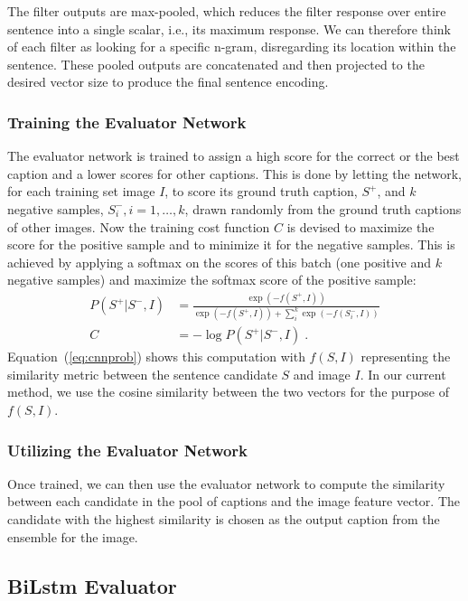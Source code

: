 The filter outputs are max-pooled, which reduces the filter response
over entire sentence into a single scalar, i.e., its maximum
response. 
We can therefore think of each filter as looking for a specific
n-gram, disregarding its location within the sentence.
These pooled outputs are concatenated and then projected to the
desired vector size to produce the final sentence encoding.


\subsubsection{Training the Evaluator Network}

The evaluator network is trained to assign a high score for the
correct or the best caption and a lower scores for other captions.
This is done by letting the network, for each training set image $I$,
to score its ground truth caption, $S^+$, and $k$ negative samples,
$S_i^-, i=1,\ldots,k$, drawn randomly from the ground truth captions
of other images.
Now the training cost function $C$ is devised to maximize the score for
the positive sample and to minimize it for the negative samples. 
This is achieved by applying a softmax on the scores of this batch
(one positive and $k$ negative samples) and maximize the softmax score
of the positive sample:
\begin{align}
  \label{eq:cnnprob} 
  P(S^+|S^-,I) &= \frac{\exp(-f(S^+,I))}{\exp(-f(S^+,I)) +
           \sum\limits_i^k{\exp(-f(S_i^- ,I))}} \\
  C &= -\log P(S^+|S^-,I) \;.
\end{align}
Equation~(\ref{eq:cnnprob}) shows this computation with $f(S,I)$
representing the similarity metric between the sentence candidate $S$
and image $I$.
In our current method, we use the cosine similarity between the two
vectors for the purpose of $f(S,I)$.


\subsubsection{Utilizing the Evaluator Network}

Once trained, we can then use the evaluator network to compute the
similarity between each candidate in the pool of captions and the
image feature vector. 
The candidate with the highest similarity is chosen as the output
caption from the ensemble for the image.

\subsection{BiLstm Evaluator}
